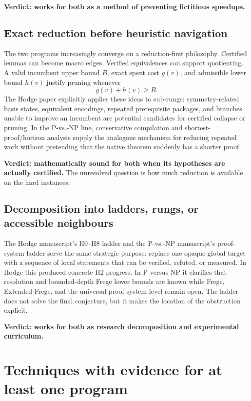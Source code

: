 \documentclass[11pt]{article}
\begin{document}
\textbf{Verdict: works for both as a method of preventing fictitious speedups.}

\subsection{Exact reduction before heuristic navigation}

The two programs increasingly converge on a reduction-first philosophy.  Certified lemmas can become macro edges.  Verified equivalences can support quotienting.  A valid incumbent upper bound \(B\), exact spent cost \(g(v)\), and admissible lower bound \(h(v)\) justify pruning whenever
\[
 g(v)+h(v)\ge B.
\]
The Hodge paper explicitly applies these ideas to sub-rungs: symmetry-related basis states, equivalent encodings, repeated prerequisite packages, and branches unable to improve an incumbent are potential candidates for certified collapse or pruning.  In the P-vs.-NP line, conservative compilation and shortest-proof/horizon analysis supply the analogous mechanism for reducing repeated work without pretending that the native theorem suddenly has a shorter proof.

\textbf{Verdict: mathematically sound for both when its hypotheses are actually certified.}  The unresolved question is how much reduction is available on the hard instances.

\subsection{Decomposition into ladders, rungs, or accessible neighbours}

The Hodge manuscript's H0--H8 ladder and the P-vs.-NP manuscript's proof-system ladder serve the same strategic purpose: replace one opaque global target with a sequence of local statements that can be verified, refuted, or measured.  In Hodge this produced concrete H2 progress.  In P versus NP it clarifies that resolution and bounded-depth Frege lower bounds are known while Frege, Extended Frege, and the universal proof-system level remain open.  The ladder does not solve the final conjecture, but it makes the location of the obstruction explicit.

\textbf{Verdict: works for both as research decomposition and experimental curriculum.}

\section{Techniques with evidence for at least one program}
\end{document}
